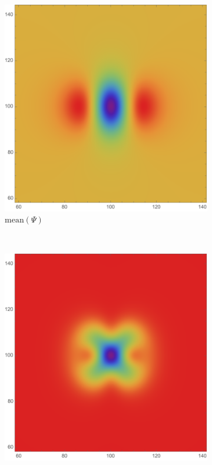\documentclass[a4paper, 11pt]{article}
\begin{document}
\begin{figure}
\centering
\begin{subfigure}[b]{0.32\textwidth}
\includegraphics[width=\textwidth]{Cusp_mean}
\caption{$\text{mean}(\Psi)$}
\end{subfigure}~
\begin{subfigure}[b]{0.32\textwidth}
\includegraphics[width=\textwidth]{Cusp_variance}

\end{subfigure}
\end{figure}
\end{document}
